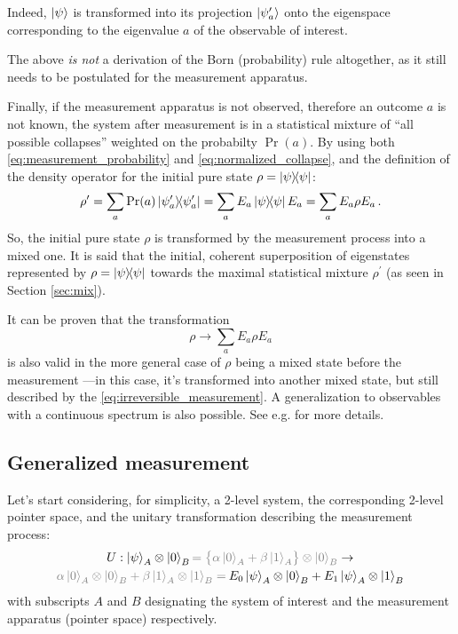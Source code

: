 Indeed,
$\ket{\psi}$
is transformed
into its projection $\ket{\psi^\prime_a}$
onto the eigenspace
corresponding to the eigenvalue $a$ of the observable of interest.

The above \emph{is not} a derivation of the Born (probability) rule altogether,
as it still needs to be postulated for the measurement apparatus.

Finally, if the measurement apparatus is not observed,
therefore an outcome $a$ is not known,
the system after measurement is in a statistical mixture
of ``all possible collapses'' weighted on the probabilty $\Pr(a)$.
By using both \eqref{eq:measurement_probability} and \eqref{eq:normalized_collapse},
and the definition of the density operator for the initial pure state
$\rho = \ketbra{\psi}$:
\[
  \rho^{\prime} = \sum_a \Pr(a) \ketbra{\psi^{\prime}_a} = \sum_a E_a \ketbra{\psi} E_a
    = \sum_a E_a \rho E_a \,\text{.}
\]
So, the initial pure state $\rho$ is transformed by the measurement process into a mixed one.
It is said that the initial, coherent superposition of eigenstates represented by $\rho = \ketbra{\psi}$
 towards the maximal statistical mixture $\rho^{\prime}$
(as seen in Section \ref{sec:mix}).

It can be proven that the transformation
\begin{equation}\label{eq:irreversible_measurement}
  \rho \rightarrow \sum_a E_a \rho E_a
\end{equation}
is also valid in the more general case of $\rho$ being a mixed state before the measurement
---in this case, it's transformed into another mixed state,
but still described by the \eqref{eq:irreversible_measurement}.
A generalization to observables with a continuous spectrum is also possible.
See e.g. \cite[Section 3.1.1]{PreskillNotes} for more details.


\subsection{Generalized measurement}

Let's start considering, for simplicity, a 2-level system,
the corresponding 2-level pointer space,
and the unitary transformation describing the measurement process:
\begin{multline}\label{eq:qubit_ortho_measurement}
  U:
    \ket{\psi}_A \ox \ket{0}_B
    {\color{gray}= \qty\big{\alpha\ket{0}_A + \beta\ket{1}_A} \ox \ket{0}_B}
  \rightarrow \\
    {\color{gray}\alpha\ket{0}_A \ox \ket{0}_B + \beta\ket{1}_A  \ox \ket{1}_B =}
    \:
    E_0\ket{\psi}_A \ox \ket{0}_B + E_1\ket{\psi}_A \ox \ket{1}_B
\end{multline}
with subscripts $A$ and $B$ designating the system of interest and
the measurement apparatus (pointer space) respectively.

